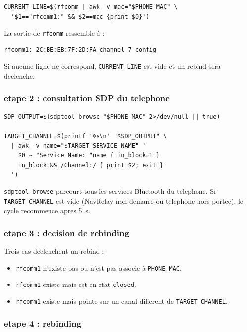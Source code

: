 \documentclass[a4paper,11pt]{article}
\begin{document}
\begin{lstlisting}[style=bashcode, showstringspaces=false]
CURRENT_LINE=$(rfcomm | awk -v mac="$PHONE_MAC" \
  '$1=="rfcomm1:" && $2==mac {print $0}')
\end{lstlisting}

La sortie de \texttt{rfcomm} ressemble à :
\begin{verbatim}
rfcomm1: 2C:BE:EB:7F:2D:FA channel 7 config
\end{verbatim}

Si aucune ligne ne correspond, \texttt{CURRENT\_LINE} est vide et un rebind
sera declenche.

\subsubsection{etape 2 : consultation SDP du telephone}

\begin{lstlisting}[style=bashcode, showstringspaces=false]
SDP_OUTPUT=$(sdptool browse "$PHONE_MAC" 2>/dev/null || true)

TARGET_CHANNEL=$(printf '%s\n' "$SDP_OUTPUT" \
  | awk -v name="$TARGET_SERVICE_NAME" '
    $0 ~ "Service Name: "name { in_block=1 }
    in_block && /Channel:/ { print $2; exit }
  ')
\end{lstlisting}

\texttt{sdptool browse} parcourt tous les services Bluetooth du telephone. Si
\texttt{TARGET\_CHANNEL} est vide (NavRelay non demarre ou telephone hors portee),
le cycle recommence apres 5~s.

\subsubsection{etape 3 : decision de rebinding}

Trois cas declenchent un rebind :

\begin{itemize}
  \item \texttt{rfcomm1} n'existe pas ou n'est pas associe à \texttt{PHONE\_MAC}.
  \item \texttt{rfcomm1} existe mais est en etat \texttt{closed}.
  \item \texttt{rfcomm1} existe mais pointe sur un canal different de
    \texttt{TARGET\_CHANNEL}.
\end{itemize}

\subsubsection{etape 4 : rebinding}
\end{document}
